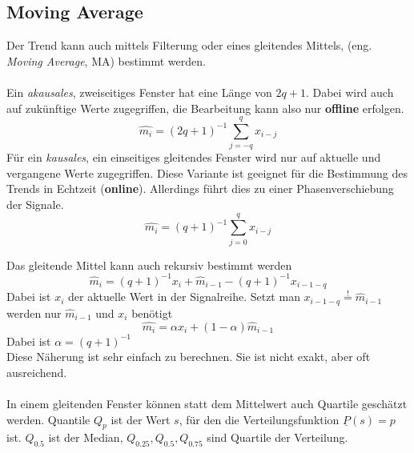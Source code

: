 \subsection{Moving Average}
Der Trend kann auch mittels Filterung oder eines gleitendes Mittels, (eng. \textsl{Moving Average}, MA) bestimmt werden.\\\\
Ein \textit{akausales}, zweiseitiges Fenster hat eine Länge von $2q + 1$. Dabei wird auch auf zukünftige Werte zugegriffen, die Bearbeitung kann also nur \textbf{offline} erfolgen.
\begin{equation}
\hat{m_i}=(2q+1)^{-1}\sum\limits_{j=-q}^q x_{i-j}
\end{equation}
Für ein \textit{kausales}, ein einseitiges gleitendes Fenster wird nur auf aktuelle und vergangene Werte zugegriffen. Diese Variante ist geeignet für die Bestimmung des Trends in Echtzeit (\textbf{online}). Allerdings führt dies zu einer Phasenverschiebung der Signale.
\begin{equation}
\hat{m_i}=(q+1)^{-1}\sum\limits_{j=0}^q x_{i-j}
\end{equation}

Das gleitende Mittel kann auch rekursiv bestimmt werden
\begin{equation}
\hat m_i=(q+1)^{-1} x_i +  \hat m_{i-1}-(q+1)^{-1} x_{i-1-q}
\end{equation}
Dabei ist $x_i$ der aktuelle Wert in der Signalreihe. Setzt man $x_{i-1-q}\stackrel{!}{=}\hat m_{i-1}$ werden nur $\hat m_{i-1}$ und $x_i$ benötigt
\begin{equation}
\hat{m_i}= \alpha x_i + (1-\alpha) \hat m_{i-1}
\end{equation}
Dabei ist $\alpha = (q+1)^{-1}$\\
Diese Näherung ist sehr einfach zu berechnen. Sie ist nicht exakt, aber oft ausreichend.\\\\
In einem gleitenden Fenster können statt dem Mittelwert auch Quartile geschätzt werden. Quantile $Q_p$ ist der Wert $s$, für den die Verteilungsfunktion $\underline P(s)=p$ ist. $Q_{0.5}$ ist der Median, $Q_{0.25},Q_{0.5},Q_{0.75}$ sind Quartile der Verteilung.

